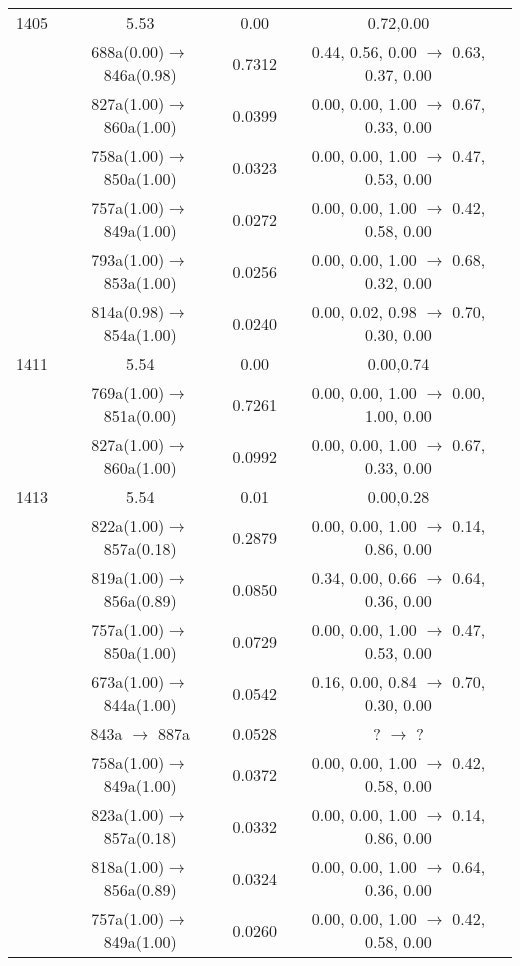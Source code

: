 \documentclass[10pt,a4paper]{article}
\begin{document}
\begin{longtable}{c|c|c|c}
 \hline1405 &	 5.53 &	 0.00 &	 0.72,0.00 \\ 
  	& 688a(0.00)$\rightarrow$846a(0.98) &	 0.7312 &	 0.44, 0.56, 0.00 $\rightarrow$ 0.63, 0.37, 0.00 \\ 
 	& 827a(1.00)$\rightarrow$860a(1.00) &	 0.0399 &	 0.00, 0.00, 1.00 $\rightarrow$ 0.67, 0.33, 0.00 \\ 
 	& 758a(1.00)$\rightarrow$850a(1.00) &	 0.0323 &	 0.00, 0.00, 1.00 $\rightarrow$ 0.47, 0.53, 0.00 \\ 
 	& 757a(1.00)$\rightarrow$849a(1.00) &	 0.0272 &	 0.00, 0.00, 1.00 $\rightarrow$ 0.42, 0.58, 0.00 \\ 
 	& 793a(1.00)$\rightarrow$853a(1.00) &	 0.0256 &	 0.00, 0.00, 1.00 $\rightarrow$ 0.68, 0.32, 0.00 \\ 
 	& 814a(0.98)$\rightarrow$854a(1.00) &	 0.0240 &	 0.00, 0.02, 0.98 $\rightarrow$ 0.70, 0.30, 0.00 \\ 
 \hline1411 &	 5.54 &	 0.00 &	 0.00,0.74 \\ 
  	& 769a(1.00)$\rightarrow$851a(0.00) &	 0.7261 &	 0.00, 0.00, 1.00 $\rightarrow$ 0.00, 1.00, 0.00 \\ 
 	& 827a(1.00)$\rightarrow$860a(1.00) &	 0.0992 &	 0.00, 0.00, 1.00 $\rightarrow$ 0.67, 0.33, 0.00 \\ 
 \hline1413 &	 5.54 &	 0.01 &	 0.00,0.28 \\ 
  	& 822a(1.00)$\rightarrow$857a(0.18) &	 0.2879 &	 0.00, 0.00, 1.00 $\rightarrow$ 0.14, 0.86, 0.00 \\ 
 	& 819a(1.00)$\rightarrow$856a(0.89) &	 0.0850 &	 0.34, 0.00, 0.66 $\rightarrow$ 0.64, 0.36, 0.00 \\ 
 	& 757a(1.00)$\rightarrow$850a(1.00) &	 0.0729 &	 0.00, 0.00, 1.00 $\rightarrow$ 0.47, 0.53, 0.00 \\ 
 	& 673a(1.00)$\rightarrow$844a(1.00) &	 0.0542 &	 0.16, 0.00, 0.84 $\rightarrow$ 0.70, 0.30, 0.00 \\ 
 	& 843a $\rightarrow$ 887a &	 0.0528 &	 ? $\rightarrow$ ?  \\ 
 	& 758a(1.00)$\rightarrow$849a(1.00) &	 0.0372 &	 0.00, 0.00, 1.00 $\rightarrow$ 0.42, 0.58, 0.00 \\ 
 	& 823a(1.00)$\rightarrow$857a(0.18) &	 0.0332 &	 0.00, 0.00, 1.00 $\rightarrow$ 0.14, 0.86, 0.00 \\ 
 	& 818a(1.00)$\rightarrow$856a(0.89) &	 0.0324 &	 0.00, 0.00, 1.00 $\rightarrow$ 0.64, 0.36, 0.00 \\ 
 	& 757a(1.00)$\rightarrow$849a(1.00) &	 0.0260 &	 0.00, 0.00, 1.00 $\rightarrow$ 0.42, 0.58, 0.00 \\ 

\end{longtable}
\end{document}
